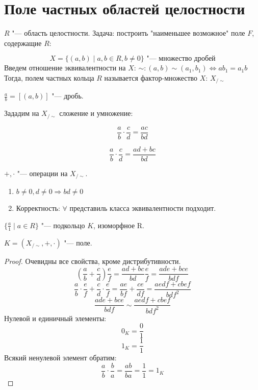 \section{Поле частных областей целостности}
$R$ "--- область целостности.
Задача: построить "наименьшее возможное" поле $F$, содержащие $R$:
\begin{Def}
$$X = \{(a, b) \mid a, b \in R, b \neq 0 \} \text{ "--- множество дробей}$$
Введем отношение эквивалентности на $X$:
$\sim \colon (a, b) \sim (a_1, b_1) \Leftrightarrow ab_1 = a_1b$
Тогда, полем частных кольца $R$ называется фактор-множество $X$: $X_{/\sim}$
\end{Def}
\begin{Def}
$\frac{a}{b} = [(a, b)]$ "--- дробь.
\end{Def}
Зададим на $X_{/\sim}$ сложение и умножение:
\begin{Def}
$$\frac{a}{b} \cdot \frac{c}{d} = \frac{ac}{bd}$$
\end{Def}
\begin{Def}
$$\frac{a}{b} \cdot \frac{c}{d} = \frac{ad + bc}{bd}$$
\end{Def}
\begin{assertion}
$+, \cdot$ "--- операции на $X_{/\sim}$.
\begin{enumerate}
\item $b \neq 0, d \neq 0 \Rightarrow bd \neq 0$
\item Корректность: $\forall$ представиль класса эквивалентности подходит.
\end{enumerate}
\end{assertion}
\begin{assertion}
$\{\frac{a}{1} \mid a \in R \}$ "--- подкольцо $K$, изоморфное R.
\end{assertion}
\begin{theorem}
$K = (X_{/\sim}, +, \cdot)$ "--- поле.
\end{theorem}
\begin{proof}
Очевидны все свойства, кроме дистрибутивности.
$$\left(\frac{a}{b} + \frac{c}{d}\right) \frac{e}{f} = \frac{ad + bc}{bd} \frac{e}{f} = \frac{ade + bce}{bdf}$$
$$\frac{a}{b} \cdot \frac{e}{f} + \frac{c}{d} \cdot \frac{e}{f} = \frac{ae}{bf} + \frac{ce}{df} = \frac{aedf + cbef}{bdf^2}$$
$$\frac{ade + bce}{bdf} \sim \frac{aedf + cbef}{bdf^2}$$
Нулевой и единичный элементы:
$$0_K = \frac{0}{1}$$
$$1_K = \frac{1}{1}$$
Всякий ненулевой элемент обратим:
$$\frac{a}{b} \cdot \frac{b}{a} = \frac{ab}{ba} = \frac{1}{1} = 1_K$$
\end{proof}
